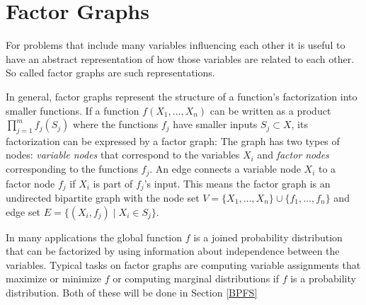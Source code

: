 \section{Factor Graphs}

For problems that include many variables influencing each other it is useful to have an abstract representation of how those	 variables are related to each other. So called factor graphs are such representations.\newline

In general, factor graphs represent the structure of a function's factorization into smaller functions. \newline If a function $f(X_1, \ldots, X_n)$ can be written as a product $\prod_{j=1}^{m}{f_j(S_j)}$  where the functions $f_j$ have smaller inputs $S_j \subset X$, its factorization 
can be expressed by a factor graph: The graph has two types of nodes: 
\emph{variable nodes} that correspond to the variables $X_i$ and \emph{factor nodes} corresponding to the functions $f_j$. An edge connects a variable node $X_i$ to a factor node $f_j$ if $X_i$ is part of $f_j$'s input. 
This means the factor graph is an undirected bipartite graph with the node set $ V = \{X_1, \ldots, X_n\} \cup \{f_1, \ldots, f_n\}$ and edge set $E = \{(X_i, f_j) \; | \; X_i \in S_j\}$. 

In many applications the global function $f$ is a joined probability distribution that can be factorized by using information about independence between the variables. Typical tasks on factor graphs are computing variable assignments that maximize or minimize $f$ or computing marginal distributions if $f$ is a probability distribution. Both of these will be done in Section \ref{BPFS}\newline

